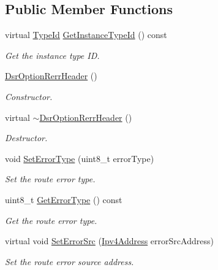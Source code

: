 \subsection*{Public Member Functions}
\begin{DoxyCompactItemize}
\item 
virtual \hyperlink{classns3_1_1TypeId}{Type\+Id} \hyperlink{classns3_1_1dsr_1_1DsrOptionRerrHeader_a91a38a306a9907787e8760b836b24d78}{Get\+Instance\+Type\+Id} () const 
\begin{DoxyCompactList}\small\item\em Get the instance type ID. \end{DoxyCompactList}\item 
\hyperlink{classns3_1_1dsr_1_1DsrOptionRerrHeader_a7ca20597961f2ac0da592f5c64d638ee}{Dsr\+Option\+Rerr\+Header} ()
\begin{DoxyCompactList}\small\item\em Constructor. \end{DoxyCompactList}\item 
virtual \hyperlink{classns3_1_1dsr_1_1DsrOptionRerrHeader_a919a64ce642ff10657a5860efc39810d}{$\sim$\+Dsr\+Option\+Rerr\+Header} ()
\begin{DoxyCompactList}\small\item\em Destructor. \end{DoxyCompactList}\item 
void \hyperlink{classns3_1_1dsr_1_1DsrOptionRerrHeader_a276e77bd18c2df8bee92759f6d789701}{Set\+Error\+Type} (uint8\+\_\+t error\+Type)
\begin{DoxyCompactList}\small\item\em Set the route error type. \end{DoxyCompactList}\item 
uint8\+\_\+t \hyperlink{classns3_1_1dsr_1_1DsrOptionRerrHeader_afe286988e6463b3176310a27ac91d49e}{Get\+Error\+Type} () const 
\begin{DoxyCompactList}\small\item\em Get the route error type. \end{DoxyCompactList}\item 
virtual void \hyperlink{classns3_1_1dsr_1_1DsrOptionRerrHeader_af1c58527d87b6751166645d9cbb98f13}{Set\+Error\+Src} (\hyperlink{classns3_1_1Ipv4Address}{Ipv4\+Address} error\+Src\+Address)
\begin{DoxyCompactList}\small\item\em Set the route error source address. \end{DoxyCompactList}\item 

\end{DoxyCompactItemize}
